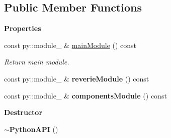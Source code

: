 \subsection*{Public Member Functions}
\begin{Indent}\textbf{ Properties}\par
\begin{DoxyCompactItemize}
\item 
\mbox{\label{classrev_1_1_python_a_p_i_ace26b2cca594494e55088481bd1be2c9}} 
const py\+::module\+\_\+ \& \mbox{\hyperlink{classrev_1_1_python_a_p_i_ace26b2cca594494e55088481bd1be2c9}{main\+Module}} () const
\begin{DoxyCompactList}\small\item\em Return main module. \end{DoxyCompactList}\item 
\mbox{\label{classrev_1_1_python_a_p_i_a7ea522a6fed65841917af63c0628c1f6}} 
const py\+::module\+\_\+ \& {\bfseries reverie\+Module} () const
\item 
\mbox{\label{classrev_1_1_python_a_p_i_a054b7d77a3d16398e66e66f2c835ba59}} 
const py\+::module\+\_\+ \& {\bfseries components\+Module} () const
\end{DoxyCompactItemize}
\end{Indent}
\begin{Indent}\textbf{ Destructor}\par
\begin{DoxyCompactItemize}
\item 
\mbox{\label{classrev_1_1_python_a_p_i_a4be64e30a1a73337ec1a0732d482391d}} 
{\bfseries $\sim$\+Python\+A\+PI} ()
\end{DoxyCompactItemize}
\end{Indent}
